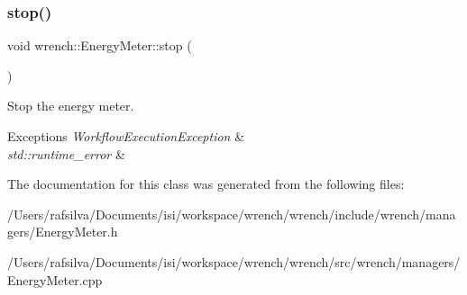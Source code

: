 \subsubsection{\texorpdfstring{stop()}{stop()}}
{\footnotesize\ttfamily void wrench\+::\+Energy\+Meter\+::stop (\begin{DoxyParamCaption}{ }\end{DoxyParamCaption})}



Stop the energy meter. 


\begin{DoxyExceptions}{Exceptions}
{\em Workflow\+Execution\+Exception} & \\
\hline
{\em std\+::runtime\+\_\+error} & \\
\hline
\end{DoxyExceptions}


The documentation for this class was generated from the following files\+:\begin{DoxyCompactItemize}
\item 
/\+Users/rafsilva/\+Documents/isi/workspace/wrench/wrench/include/wrench/managers/Energy\+Meter.\+h\item 
/\+Users/rafsilva/\+Documents/isi/workspace/wrench/wrench/src/wrench/managers/Energy\+Meter.\+cpp\end{DoxyCompactItemize}
